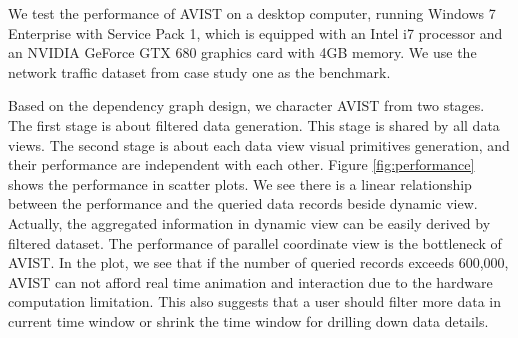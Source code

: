 We test the performance of AVIST on a desktop computer, running Windows 7 Enterprise with Service Pack 1, which is equipped with an Intel i7 processor and an NVIDIA GeForce GTX 680 graphics card with 4GB memory. We use the network traffic dataset from case study one as the benchmark.  



Based on the dependency graph design, we character  AVIST from two stages. The first stage is about filtered data generation. This stage is shared by all data views. The second stage is about each data view visual primitives generation, and their performance are independent with each other. Figure \ref{fig:performance} shows the performance in scatter plots. 
We see there is a linear relationship between the performance and the queried data records beside dynamic view.
Actually, the aggregated information in dynamic view can be easily derived by filtered dataset. The performance of parallel coordinate view is the bottleneck of AVIST. In the plot, we see that if the number of queried records exceeds 600,000, AVIST can not afford real time animation and interaction due to the hardware computation limitation. This also suggests that a user should filter more data in current time window or shrink the time window  for drilling down data details.








